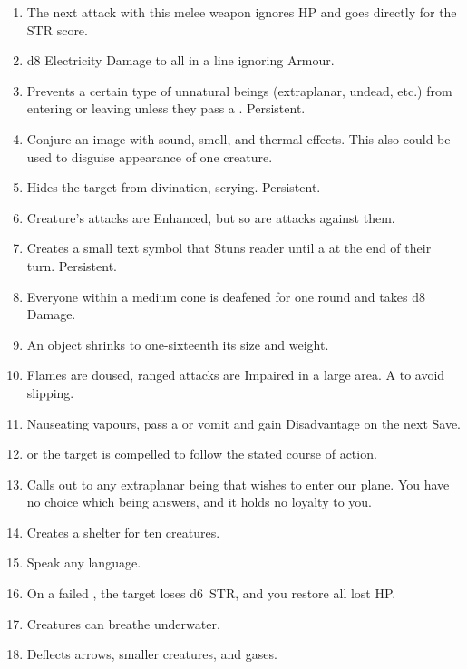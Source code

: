 \documentclass[itdr]{subfiles}
\begin{document}
\begin{enumerate}
	\item {} The next attack with this melee weapon ignores HP and goes directly for the STR score.
	\vfill
	\break
	\item {} d8 Electricity Damage to all in a line ignoring Armour.
	\item {} Prevents a certain type of unnatural beings (extraplanar, undead, etc.) from entering or leaving unless they pass a . Persistent.
	\item {} Conjure an image with sound, smell, and thermal effects. This also could be used to disguise appearance of one creature.
	\item {} Hides the target from divination, scrying. Persistent.
	\item {} Creature's attacks are Enhanced, but so are attacks against them.
	\item {} Creates a small text symbol that Stuns reader until a  at the end of their turn. Persistent.
	\item {} Everyone within a medium cone is deafened for one round and takes d8 Damage.
	\item {} An object shrinks to one-sixteenth its size and weight.
	\item {} Flames are doused, ranged attacks are Impaired in a large area. A  to avoid slipping.
	\item {} Nauseating vapours, pass a  or vomit and gain Disadvantage on the next Save.
	\item {}  or the target is \mbox{compelled} to follow the stated course of action.
	\item {} Calls out to any extraplanar being that wishes to enter our plane. You have no choice which being answers, and it holds no loyalty to you.
	\item {} Creates a shelter for ten creatures.
	\item {} Speak any language.
	\item {} On a failed , the target loses d6~STR, and you restore all lost HP.
	\item {} Creatures can breathe underwater.
	\item {} Deflects arrows, smaller creatures, and gases.
\end{enumerate}
\end{document}
